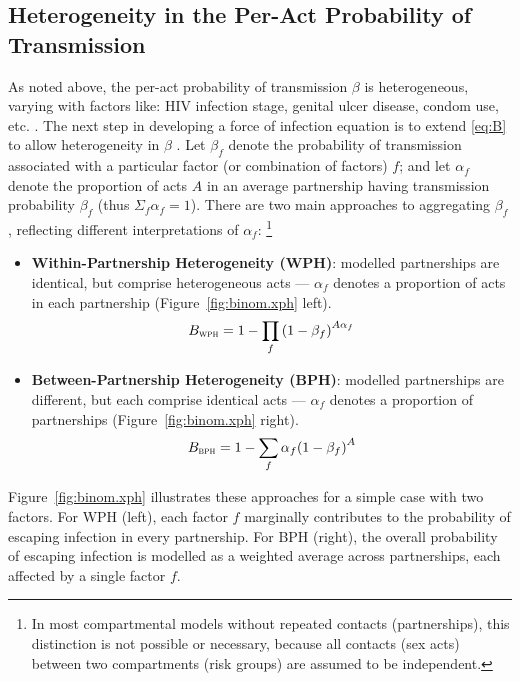 \subsection{Heterogeneity in the Per-Act Probability of Transmission}\label{foi.prior.xph}
As noted above, the per-act probability of transmission $\beta$ is heterogeneous,
varying with factors like: HIV infection stage, genital ulcer disease, condom use, etc.
\cite{Boily2009,Giannou2016}.
The next step in developing a force of infection equation is to extend \eqref{eq:B}
to allow heterogeneity in $\beta$ \cite{Allard1990}.
Let $\beta_f$ denote the probability of transmission associated
with a particular factor (or combination of factors) $f$; and
let $\alpha_f$ denote the proportion of acts $A$ in an average partnership
having transmission probability $\beta_f$
(thus $\Sigma_f \alpha_f = 1$).
There are two main approaches to aggregating $\beta_f$,
reflecting different interpretations of $\alpha_f$:%
\footnote{In most compartmental models without repeated contacts (partnerships),
  this distinction is not possible or necessary, because
  all contacts (sex acts) between two compartments (risk groups) are assumed to be independent.}
\begin{itemize}
  \item \textbf{{Within}-Partnership Heterogeneity (WPH)}:
  modelled partnerships are identical, but comprise heterogeneous acts
  --- $\alpha_f$ denotes a proportion of acts in each partnership
  (Figure~\ref{fig:binom.xph} left).
  \begin{equation}\label{eq:B.wph}
    B_{\textsc{wph}} = 1 - \prod_f {(1 - \beta_f)}^{A\alpha_f}
  \end{equation}
  \item \textbf{{Between}-Partnership Heterogeneity (BPH)}:
  modelled partnerships are different, but each comprise identical acts
  --- $\alpha_f$ denotes a proportion of partnerships
  (Figure~\ref{fig:binom.xph} right).
  \begin{equation}\label{eq:B.bph}
    B_{\textsc{bph}} = 1 - \sum_f \alpha_f {(1 - \beta_f)}^{A}
  \end{equation}
\end{itemize}
Figure~\ref{fig:binom.xph} illustrates these approaches for a simple case with two factors.
For WPH (left), each factor $f$ marginally contributes to
the probability of escaping infection in every partnership.
For BPH (right), the overall probability of escaping infection is modelled as
a weighted average across partnerships, each affected by a single factor $f$.

